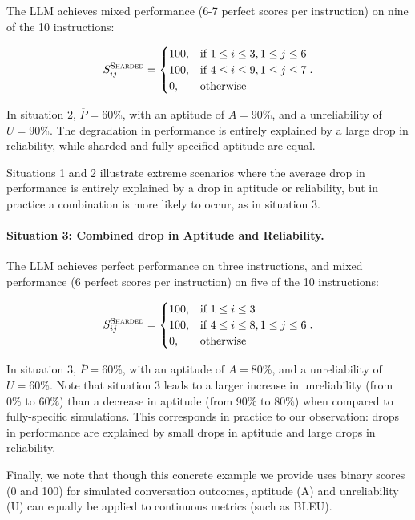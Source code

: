 \documentclass{article}
\begin{document}
\begin{appendices}
The LLM achieves mixed performance (6-7 perfect scores per instruction) on nine of the 10 instructions:

$$
S^{\textsc{Sharded}}_{ij} = 
\begin{cases}
100, & \text{if } 1 \leq i \leq 3, 1 \leq j \leq 6 \\
100, & \text{if } 4 \leq i \leq 9, 1 \leq j \leq 7 \\
0,   & \text{otherwise} 
\end{cases}.
$$

In situation 2, $\overline{P} = 60$\%, with an aptitude of $A=90$\%, and a unreliability of $U=90$\%. The degradation in performance is entirely explained by a large drop in reliability, while sharded and fully-specified aptitude are equal.

Situations 1 and 2 illustrate extreme scenarios where the average drop in performance is entirely explained by a drop in aptitude or reliability, but in practice a combination is more likely to occur, as in situation 3.

\paragraph{Situation 3: Combined drop in Aptitude and Reliability.}

The LLM achieves perfect performance on three instructions, and mixed performance (6 perfect scores per instruction) on five of the 10 instructions:

$$
S^{\textsc{Sharded}}_{ij} = 
\begin{cases}
100, & \text{if } 1 \leq i \leq 3 \\
100, & \text{if } 4 \leq i \leq 8, 1 \leq j \leq 6 \\
0,   & \text{otherwise} 
\end{cases}.
$$

In situation 3, $\overline{P} = 60$\%, with an aptitude of $A=80$\%, and a unreliability of $U=60$\%. Note that situation 3 leads to a larger increase in unreliability (from 0\% to 60\%) than a decrease in aptitude (from 90\% to 80\%) when compared to fully-specific simulations. This corresponds in practice to our observation: drops in performance are explained by small drops in aptitude and large drops in reliability.

Finally, we note that though this concrete example we provide uses binary scores (0 and 100) for simulated conversation outcomes, aptitude (A) and unreliability (U) can equally be applied to continuous metrics (such as BLEU).


\end{appendices}
\end{document}
